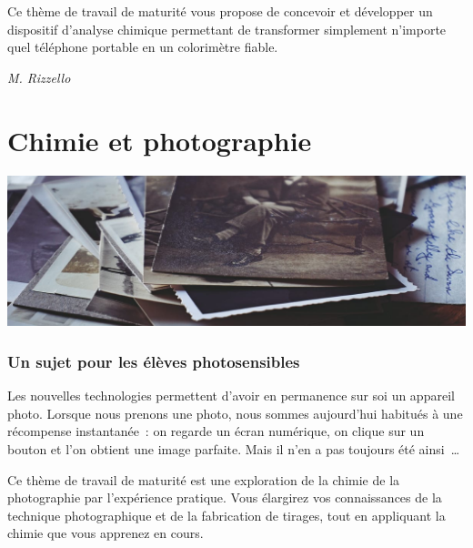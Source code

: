 \documentclass[
  10pt,
  french,
  a5paper,
  openany]{book}
\newenvironment{signature}{\begin{flushright}}{\end{flushright}}
\begin{document}
Ce thème de travail de maturité vous propose de concevoir et développer un dispositif d'analyse chimique permettant de transformer simplement n'importe quel téléphone portable en un colorimètre fiable.

\begin{signature}
\emph{M. Rizzello}

\end{signature}

\hypertarget{chimie-et-photographie}{%
\chapter{Chimie et photographie}\label{chimie-et-photographie}}

\begin{center}
\includegraphics[width=1\textwidth,height=\textheight]{images/chimie-et-photographie.jpg}

\end{center}


\hypertarget{un-sujet-pour-les-uxe9luxe8ves-photosensibles}{%
\subsection*{Un sujet pour les élèves photosensibles}\label{un-sujet-pour-les-uxe9luxe8ves-photosensibles}}

Les nouvelles technologies permettent d'avoir en permanence sur soi un appareil photo. Lorsque nous prenons une photo, nous sommes aujourd'hui habitués à une récompense instantanée~: on regarde un écran numérique, on clique sur un bouton et l'on obtient une image parfaite. Mais il n'en a pas toujours été ainsi~\ldots{}

Ce thème de travail de maturité est une exploration de la chimie de la photographie par l'expérience pratique. Vous élargirez vos connaissances de la technique photographique et de la fabrication de tirages, tout en appliquant la chimie que vous apprenez en cours.
\end{document}
